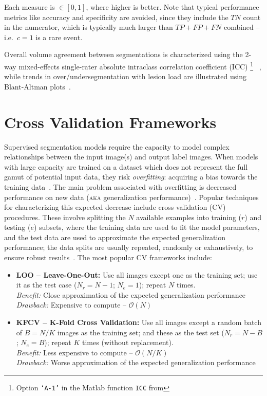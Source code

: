 Each measure is $\in [0,1]$, where higher is better.
Note that typical performance metrics like accuracy and specificity are avoided,
since they include the $TN$ count in the numerator,
which is typically much larger than $TP + FP + FN$ combined -- i.e.\ $c=1$ is a rare event.
\par
Overall volume agreement between segmentations is characterized using
the 2-way mixed-effects single-rater absolute intraclass correlation coefficient (ICC)%
\footnote{Option \texttt{`A-1'} in the Matlab function \texttt{ICC} from
  }%
~\cite{Koo2016}, while trends in over/undersegmentation with lesion load
are illustrated using Blant-Altman plots~\cite{Altman1983}.
\section{Cross Validation Frameworks}\label{s:cv-frameworks}
Supervised segmentation models require the capacity to model
complex relationships between the input image(s) and output label images.
When models with large capacity are trained on
a dataset which does not represent the full gamut of potential input data,
they risk \textit{overfitting}: acquiring a bias towards the training data~\cite{Hawkins2004}.
The main problem associated with overfitting is decreased performance on new data
(\textsc{aka} generalization performance)~\cite{Hawkins2004}.
Popular techniques for characterizing this expected decrease include
cross validation (CV) procedures.
These involve splitting the $N$ available examples into training ($r$) and testing ($e$) subsets,
where the training data are used to fit the model parameters,
and the test data are used to approximate the expected generalization performance;
the data splits are usually repeated, randomly or exhaustively,
to ensure robust results~\cite{Arlot2010}.
The most popular CV frameworks include:
\begin{itemize}
  \item\textbf{LOO -- Leave-One-Out:}
  Use all images except one as the training set;
  use it as the test case ($N_r = N-1$; $N_e = 1$);
  repeat $N$ times.
  \\\textit{Benefit:} Close approximation of the expected generalization performance
  \\\textit{Drawback:} Expensive to compute -- $\mathcal{O}(N)$
  \item\textbf{KFCV -- K-Fold Cross Validation:}
  Use all images except a random batch of $B = N/K$ images as the training set;
  and these as the test set ($N_r = N-B$; $N_e = B$);
  repeat $K$ times (without replacement).
  \\\textit{Benefit:} Less expensive to compute -- $\mathcal{O}(N/K)$
  \\\textit{Drawback:} Worse approximation of the expected generalization performance
\end{itemize}
